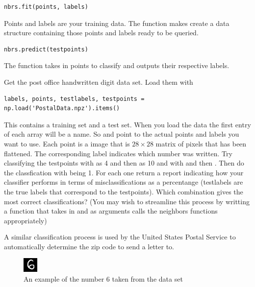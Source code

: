 \begin{lstlisting}
nbrs.fit(points, labels)
\end{lstlisting}
Points and labels are your training data. 
The  function makes  create a data structure containing those points and labels ready to be queried. 

\begin{lstlisting}
nbrs.predict(testpoints)
\end{lstlisting}

The function  takes in points to classify and outputs their respective labels.  
\begin{problem}
Get the post office handwritten digit data set. Load them with
\begin{lstlisting}
labels, points, testlabels, testpoints = np.load('PostalData.npz').items()
\end{lstlisting}
This contains a training set and a test set. 
When you load the data the first entry of each array will be a name. 
So  and  point to the actual points and labels you want to use. 
Each point is a  image that is $28 \times 28$ matrix of pixels that has been flattened. 
The corresponding label indicates which number was written.  
Try classifying the testpoints with  as 4 and then as 10 and with   and then . Then do the classfication with  being 1. 
For each one return a report indicating how your classifier performs in terms of misclassifications as a percentange (testlabels are the true labels that correspond to the testpoints). 
Which combination gives the most correct classifications?
(You may wish to streamline this process by writting a function that takes in  and  as arguments calls the neighbors functions appropriately)


A similar classification process is used by the United States Postal Service to automatically determine the zip code to send a letter to.

\begin{figure}[H]
\includegraphics[width=.25\textwidth]{Example.png}
\caption{An example of the number 6 taken from the data set}
\end{figure}
\end{problem}


